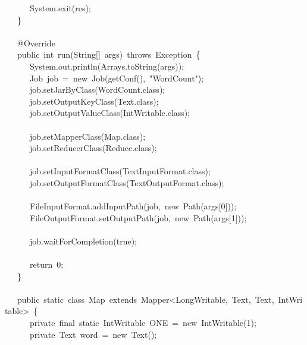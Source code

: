 \documentclass{article}
\begin{document}
\begin{mdpre}
~~~~~~System.exit(res);\\
~~~\}\\
\\
~~~@Override\\
~~~{public}~{int}~run(String{}[]~args)~{throws}~Exception~\{\\
~~~~~~System.out.println(Arrays.{toString}(args));\\
~~~~~~Job~job~=~{new}~Job(getConf(),~{"}{WordCount}{"});\\
~~~~~~job.setJarByClass(WordCount.{class});\\
~~~~~~job.setOutputKeyClass(Text.{class});\\
~~~~~~job.setOutputValueClass(IntWritable.{class});\\
\\
~~~~~~job.setMapperClass(Map.{class});\\
~~~~~~job.setReducerClass(Reduce.{class});\\
\\
~~~~~~job.setInputFormatClass(TextInputFormat.{class});\\
~~~~~~job.setOutputFormatClass(TextOutputFormat.{class});\\
\\
~~~~~~FileInputFormat.addInputPath(job,~{new}~Path(args{}[{0}]));\\
~~~~~~FileOutputFormat.setOutputPath(job,~{new}~Path(args{}[{1}]));\\
\\
~~~~~~job.waitForCompletion({true});\\
~~~~~~\\
~~~~~~{return}~{0};\\
~~~\}\\
~~~\\
~~~{public}~{static}~{class}~Map~{extends}~Mapper\textless{}LongWritable,~Text,~Text,~IntWritable\textgreater{}~\{\\
~~~~~~{private}~{final}~{static}~IntWritable~ONE~=~{new}~IntWritable({1});\\
~~~~~~{private}~Text~word~=~{new}~Text();\\

\end{mdpre}
\end{document}
